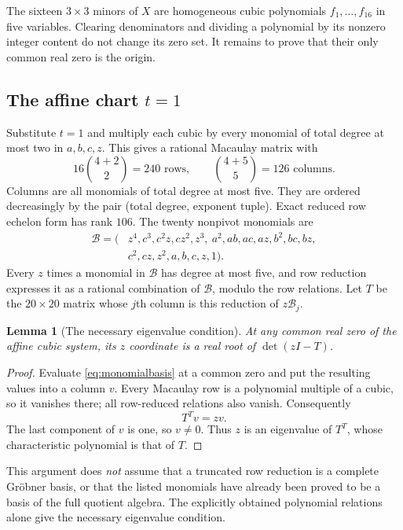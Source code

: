 \documentclass[11pt]{article}
\newtheorem{lemma}[theorem]{Lemma}
\theoremstyle{definition}
\begin{document}
The sixteen $3\times3$ minors of $X$ are homogeneous cubic polynomials $f_1,\ldots,f_{16}$ in five variables. Clearing denominators and dividing a polynomial by its nonzero integer content do not change its zero set. It remains to prove that their only common real zero is the origin.

\subsection{The affine chart \texorpdfstring{$t=1$}{t = 1}}
Substitute $t=1$ and multiply each cubic by every monomial of total degree at most two in $a,b,c,z$. This gives a rational Macaulay matrix with
\[
 16\binom{4+2}{2}=240\text{ rows},\qquad
 \binom{4+5}{5}=126\text{ columns}.
\]
Columns are all monomials of total degree at most five. They are ordered decreasingly by the pair (total degree, exponent tuple). Exact reduced row echelon form has rank $106$. The twenty nonpivot monomials are
\begin{equation}\label{eq:monomialbasis}
 \begin{split}
 \mathcal B=(&z^4,c^3,c^2z,cz^2,z^3,\ a^2,ab,ac,az,b^2,bc,bz,\\
             &c^2,cz,z^2,a,b,c,z,1).
 \end{split}
\end{equation}
Every $z$ times a monomial in $\mathcal B$ has degree at most five, and row reduction expresses it as a rational combination of $\mathcal B$, modulo the row relations. Let $T$ be the $20\times20$ matrix whose $j$th column is this reduction of $z\mathcal B_j$.

\begin{lemma}[The necessary eigenvalue condition]\label{lem:eigenvalue}
At any common real zero of the affine cubic system, its $z$ coordinate is a real root of $\det(zI-T)$.
\end{lemma}
\begin{proof}
Evaluate \eqref{eq:monomialbasis} at a common zero and put the resulting values into a column $v$. Every Macaulay row is a polynomial multiple of a cubic, so it vanishes there; all row-reduced relations also vanish. Consequently
\[
 T^Tv=zv.
\]
The last component of $v$ is one, so $v\neq0$. Thus $z$ is an eigenvalue of $T^T$, whose characteristic polynomial is that of $T$.
\end{proof}

This argument does \emph{not} assume that a truncated row reduction is a complete Gr\"obner basis, or that the listed monomials have already been proved to be a basis of the full quotient algebra. The explicitly obtained polynomial relations alone give the necessary eigenvalue condition.
\end{document}
